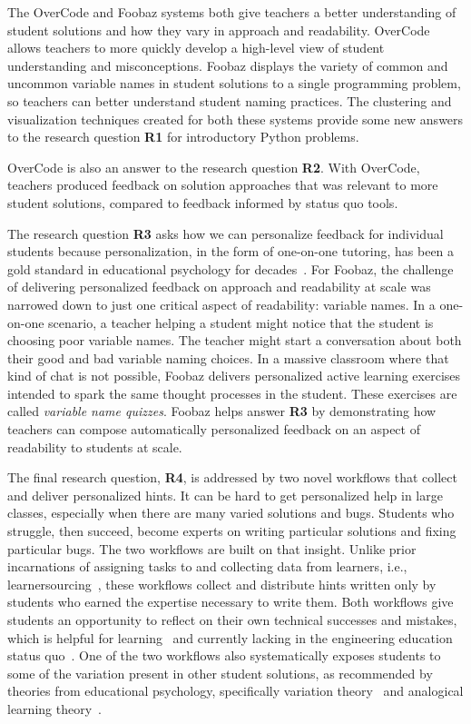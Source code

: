 The OverCode and Foobaz systems both give teachers a better understanding of student solutions and how they vary in approach and readability. OverCode allows teachers to more quickly develop a high-level view of student understanding and misconceptions. Foobaz displays the variety of common and uncommon variable names in student solutions to a single programming problem, so teachers can better understand student naming practices. The clustering and visualization techniques created for both these systems provide some new answers to the research question {\bf R1} for introductory Python problems. 

OverCode is also an answer to the research question {\bf R2}. With OverCode, teachers produced feedback on solution approaches that was relevant to more student solutions, compared to feedback informed by status quo tools. 

The research question {\bf R3} asks how we can personalize feedback for individual students because personalization, in the form of one-on-one tutoring, has been a gold standard in educational psychology for decades~\cite{bloom}. For Foobaz, the challenge of delivering personalized feedback on approach and readability at scale was narrowed down to just one critical aspect of readability: variable names. In a one-on-one scenario, a teacher helping a student might notice that the student is choosing poor variable names. The teacher might start a conversation about both their good and bad variable naming choices. In a massive classroom where that kind of chat is not possible, Foobaz delivers personalized active learning exercises intended to spark the same thought processes in the student. These exercises are called {\it variable name quizzes}. Foobaz helps answer {\bf R3} by demonstrating how teachers can compose automatically personalized feedback on an aspect of readability to students at scale.

The final research question, {\bf R4}, is addressed by two novel workflows that collect and deliver personalized hints. It can be hard to get personalized help in large classes, especially when there are many varied solutions and bugs. Students who struggle, then succeed, become experts on writing particular solutions and fixing particular bugs. The two workflows are built on that insight. Unlike prior incarnations of assigning tasks to and collecting data from learners, i.e., learnersourcing~\cite{kim2013learnersourcing}, these workflows collect and distribute hints written only by students who earned the expertise necessary to write them. Both workflows give students an opportunity to reflect on their own technical successes and mistakes, which is helpful for learning~\cite{dewey1933} and currently lacking in the engineering education status quo~\cite{asee}. One of the two workflows also systematically exposes students to some of the variation present in other student solutions, as recommended by theories from educational psychology, specifically variation theory~\cite{marton1997learning} and analogical learning theory~\cite{kurtz01learning,loewenstein2003analogical}.

